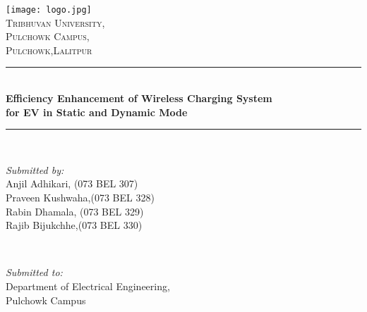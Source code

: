 \begin{titlepage}
	\newcommand{\HRule}{\rule{\linewidth}{1mm}} %
	\center %
	\texttt{[image: logo.jpg]}\\[1cm] %
	\textsc{\LARGE Tribhuvan University, }\\[0.4cm] %
	\textsc{\Large Pulchowk Campus,}\\[0.4cm] %
	\textsc{\large Pulchowk,Lalitpur}\\[0.4cm] %
	\HRule \\[0.4cm]
	{ \large \bfseries Efficiency Enhancement of Wireless Charging System \\[0.3cm] for EV in Static and Dynamic Mode} \\[0.4cm] %
	\HRule \\[1.5cm]


	\begin{minipage}{0.4\textwidth}
		\begin{flushleft} 
			\emph{Submitted by:}\\
			Anjil Adhikari, (073 BEL 307)\\
			Praveen Kushwaha,(073 BEL 328)\\
			Rabin Dhamala, (073 BEL 329)\\
			Rajib Bijukchhe,(073 BEL 330)\\
		\end{flushleft}
	\end{minipage}
	~	
	\begin{minipage}{0.5\textwidth}
		\begin{flushright} 
			\emph{Submitted to:} \\
			Department of Electrical Engineering, \\
			Pulchowk Campus
		\end{flushright}
	\end{minipage}\\[2cm]


\end{titlepage}
